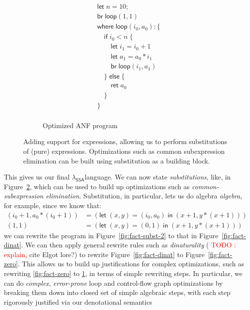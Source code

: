 \documentclass[acmsmall,screen,review]{acmart}
\newcounter{todos}
\newcommand{\todo}[1]{\stepcounter{todos} \textcolor{red}{TODO \arabic{todos}: #1}}
\newcommand{\ms}[1]{\ensuremath{\mathsf{#1}}}
\newcommand{\isotopessa}{\(\lambda_{\ms{SSA}}\)}
\begin{document}
\begin{figure}
\begin{subfigure}[t]{.31\textwidth}
\begin{align*}
      & \ms{let}\;n = 10; \\
      & \ms{br}\;\ms{loop}(1, 1) \\
      & \ms{where}\;\ms{loop}(i_0, a_0): \{\\
      & \quad \ms{if}\;i_0 < n\;\{ \\
      & \qquad \ms{let}\;i_1 = i_0 + 1 \\
      & \qquad \ms{let}\;a_1 = a_0 * i_1 \\
      & \qquad \ms{br}\;\ms{loop}(i_1, a_1) \\
      & \quad \}\;\ms{else}\;\{ \\
      & \qquad \ms{ret}\;a_0 \\
      & \quad \} \\
      & \} \\
    \end{align*}
    \caption{Optimized ANF program}
    \label{fig:fact-opt}
  \end{subfigure}
  \caption{
    Adding support for expressions, allowing us to perform substitutions of (pure) expressions.
    Optimizations such as common subexpression elimination can be built using substitution as a
    building block.
  }
  \Description{}
  \label{fig:fact-cse}
\end{figure}


This gives us our final \isotopessa language. We can now state \textit{substitutions}, like, in
Figure~\ref{fig:fact-cse}, which can be used to build up optimizations such as
\textit{common-subexpression elimination}. Substitution, in particular, lets us do algebra
\textit{algebra}, for example, since we know that:
\begin{align*}
  (i_0 + 1, a_0 * (i_0 + 1)) &= (\ms{let}\;(x, y) = (i_0, a_0)\;\ms{in}\;(x + 1, y * (x + 1))) \\
  (1, 1) &= (\ms{let}\;(x, y) = (0, 1)\;\ms{in}\;(x + 1, y * (x + 1)))
\end{align*} 
we can rewrite the program in Figure~\ref{fig:fact-subst-2} to that in Figure~\ref{fig:fact-dinat}.
We can then apply general rewrite rules such as \textit{dinaturality} (\todo{explain}, cite Elgot
lore?) to rewrite Figure~\ref{fig:fact-dinat} to Figure~\ref{fig:fact-zero}. This allows us to build
up justifications for complex optimizations, such as rewriting \ref{fig:fact-zero} to
\ref{fig:fact-opt}, in terms of simple rewriting steps. In particular, we can do \textit{complex},
\textit{error-prone} loop and control-flow graph optimizations by breaking them down into closed set
of simple algebraic steps, with each step rigorously justified via our denotational semantics
\end{document}
